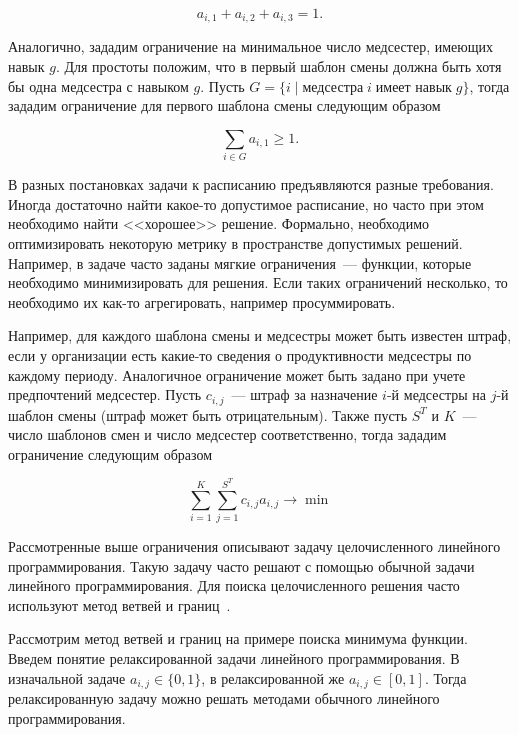 \documentclass[times,specification,annotation]{itmo-student-thesis}
\begin{document}
\begin{equation} a_{i, 1} + a_{i, 2} + a_{i, 3} = 1. \end{equation}

Аналогично, зададим ограничение на минимальное число медсестер, имеющих навык $g$.
Для простоты положим, что в первый шаблон смены должна быть хотя бы одна медсестра с навыком $g$.
Пусть $G = \{i \mid \text{медсестра}\; i\; \text{имеет навык}\; g \}$, тогда зададим ограничение для первого шаблона смены следующим образом

\begin{equation} \sum\limits_{i \in G} a_{i, 1} \ge 1. \end{equation}

В разных постановках задачи к расписанию предъявляются разные требования.
Иногда достаточно найти какое-то допустимое расписание, но часто при этом необходимо найти <<хорошее>> решение.
Формально, необходимо оптимизировать некоторую метрику в пространстве допустимых решений.
Например, в задаче часто заданы мягкие ограничения~--- функции, которые необходимо минимизировать для решения.
Если таких ограничений несколько, то необходимо их как-то агрегировать, например просуммировать.

Например, для каждого шаблона смены и медсестры может быть известен штраф, если у организации есть какие-то сведения о продуктивности медсестры по каждому периоду.
Аналогичное ограничение может быть задано при учете предпочтений медсестер.
Пусть $c_{i, j}$~--- штраф за назначение $i$-й медсестры на $j$-й шаблон смены (штраф может быть отрицательным).
Также пусть $S^T$ и $K$~--- число шаблонов смен и число медсестер соответственно, тогда зададим ограничение следующим образом

\begin{equation} \sum\limits_{i = 1}^{K}\sum\limits_{j = 1}^{S^T}{c_{i, j} a_{i, j}} \rightarrow \min \end{equation}

Рассмотренные выше ограничения описывают задачу целочисленного линейного программирования.
Такую задачу часто решают с помощью обычной задачи линейного программирования.
Для поиска целочисленного решения часто используют метод ветвей и границ~\cite{boyd2007branch}.

Рассмотрим метод ветвей и границ на примере поиска минимума функции.
Введем понятие релаксированной задачи линейного программирования.
В изначальной задаче $a_{i, j} \in \{0, 1\}$, в релаксированной же $a_{i, j} \in [0, 1]$.
Тогда релаксированную задачу можно решать методами обычного линейного программирования.
\end{document}
